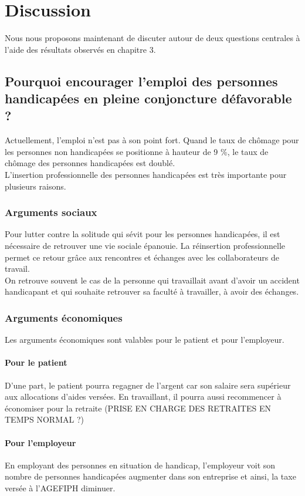 \chapter{Discussion}

Nous nous proposons maintenant de discuter autour de deux questions centrales à l'aide des résultats observés en chapitre 3.

\section{Pourquoi encourager l'emploi des personnes handicapées en pleine conjoncture défavorable ?}

Actuellement, l'emploi n'est pas à son point fort. Quand le taux de chômage pour les personnes non handicapées se positionne à hauteur de 9 \%, le taux de chômage des personnes handicapées est doublé.\\

L'insertion professionnelle des personnes handicapées est très importante pour plusieurs raisons.

\subsection{Arguments sociaux}
Pour lutter contre la solitude qui sévit pour les personnes handicapées, il est nécessaire de retrouver une vie sociale épanouie. La réinsertion professionnelle permet ce retour grâce aux rencontres et échanges avec les collaborateurs de travail. \\
On retrouve souvent le cas de la personne qui travaillait avant d'avoir un accident handicapant et qui souhaite retrouver sa faculté à travailler, à avoir des échanges.

\subsection{Arguments économiques}
Les arguments économiques sont valables pour le patient et pour l'employeur.
\subsubsection{Pour le patient}
D'une part, le patient pourra regagner de l'argent car son salaire sera supérieur aux allocations d'aides versées. En travaillant, il pourra aussi recommencer à économiser pour la retraite (PRISE EN CHARGE DES RETRAITES EN TEMPS NORMAL ?) 

\subsubsection{Pour l'employeur}
En employant des personnes en situation de handicap, l'employeur voit son nombre de personnes handicapées augmenter dans son entreprise et ainsi, la taxe versée à l'AGEFIPH diminuer.

